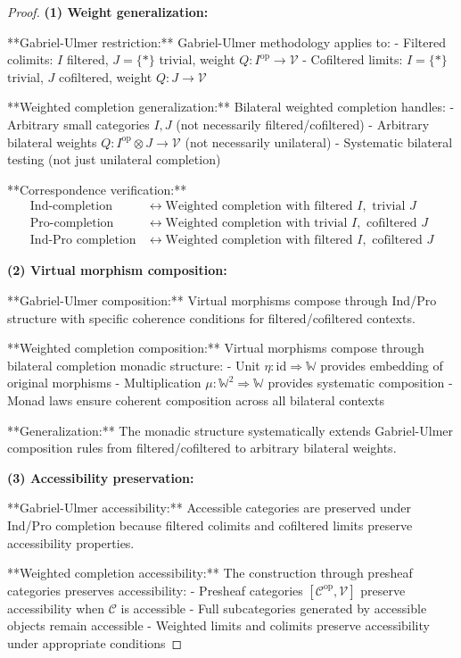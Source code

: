 \documentclass[11pt]{article}
\theoremstyle{plain}
\theoremstyle{definition}
\theoremstyle{remark}
\newcommand{\V}{\mathcal{V}}
\newcommand{\C}{\mathcal{C}}
\newcommand{\op}{\mathrm{op}}
\begin{document}
\begin{proof}
\textbf{(1) Weight generalization:}

**Gabriel-Ulmer restriction:** Gabriel-Ulmer methodology applies to:
- Filtered colimits: $I$ filtered, $J = \{\ast\}$ trivial, weight $Q : I^{\op} \to \V$ 
- Cofiltered limits: $I = \{\ast\}$ trivial, $J$ cofiltered, weight $Q : J \to \V$

**Weighted completion generalization:** Bilateral weighted completion handles:
- Arbitrary small categories $I, J$ (not necessarily filtered/cofiltered)
- Arbitrary bilateral weights $Q : I^{\op} \otimes J \to \V$ (not necessarily unilateral)
- Systematic bilateral testing (not just unilateral completion)

**Correspondence verification:**
\begin{align}
\text{Ind-completion} &\leftrightarrow \text{Weighted completion with filtered } I, \text{ trivial } J \\
\text{Pro-completion} &\leftrightarrow \text{Weighted completion with trivial } I, \text{ cofiltered } J \\
\text{Ind-Pro completion} &\leftrightarrow \text{Weighted completion with filtered } I, \text{ cofiltered } J
\end{align}

\textbf{(2) Virtual morphism composition:}

**Gabriel-Ulmer composition:** Virtual morphisms compose through Ind/Pro structure with specific coherence conditions for filtered/cofiltered contexts.

**Weighted completion composition:** Virtual morphisms compose through bilateral completion monadic structure:
- Unit $\eta : \text{id} \Rightarrow \mathbb{W}$ provides embedding of original morphisms
- Multiplication $\mu : \mathbb{W}^2 \Rightarrow \mathbb{W}$ provides systematic composition
- Monad laws ensure coherent composition across all bilateral contexts

**Generalization:** The monadic structure systematically extends Gabriel-Ulmer composition rules from filtered/cofiltered to arbitrary bilateral weights.

\textbf{(3) Accessibility preservation:}

**Gabriel-Ulmer accessibility:** Accessible categories are preserved under Ind/Pro completion because filtered colimits and cofiltered limits preserve accessibility properties.

**Weighted completion accessibility:** The construction through presheaf categories preserves accessibility:
- Presheaf categories $[\C^{\op}, \V]$ preserve accessibility when $\C$ is accessible
- Full subcategories generated by accessible objects remain accessible
- Weighted limits and colimits preserve accessibility under appropriate conditions


\end{proof}
\end{document}

